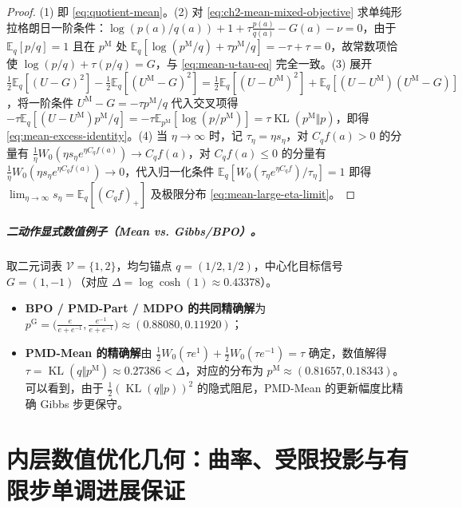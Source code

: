 \documentclass[lang=cn,scheme=chinese,openany]{../book/elegantbook}
\newcommand{\E}{\mathbb E}
\newcommand{\KL}{\operatorname{KL}}
\begin{document}
\begin{proof}
(1) 即 \cref{eq:quotient-mean}。(2) 对 \cref{eq:ch2-mean-mixed-objective} 求单纯形拉格朗日一阶条件：$\log(p(a)/q(a))+1+\tau\frac{p(a)}{q(a)}-G(a)-\nu=0$，由于 $\E_q[p/q]=1$ 且在 $p^{\mathrm M}$ 处 $\E_q[\log(p^{\mathrm M}/q)+\tau p^{\mathrm M}/q]=-\tau+\tau=0$，故常数项恰使 $\log(p/q)+\tau(p/q)=G$，与 \cref{eq:mean-u-tau-eq} 完全一致。(3) 展开 $\frac12\E_q[(U-G)^2]-\frac12\E_q[(U^{\mathrm M}-G)^2]=\frac12\E_q[(U-U^{\mathrm M})^2]+\E_q[(U-U^{\mathrm M})(U^{\mathrm M}-G)]$，将一阶条件 $U^{\mathrm M}-G=-\tau p^{\mathrm M}/q$ 代入交叉项得 $-\tau\E_q[(U-U^{\mathrm M})p^{\mathrm M}/q]=-\tau\E_{p^{\mathrm M}}[\log(p/p^{\mathrm M})]=\tau\KL(p^{\mathrm M}\Vert p)$，即得 \cref{eq:mean-excess-identity}。(4) 当 $\eta\to\infty$ 时，记 $\tau_\eta=\eta s_\eta$，对 $C_q f(a)>0$ 的分量有 $\frac{1}{\eta}W_0(\eta s_\eta e^{\eta C_q f(a)})\to C_q f(a)$，对 $C_q f(a)\le 0$ 的分量有 $\frac{1}{\eta}W_0(\eta s_\eta e^{\eta C_q f(a)})\to 0$，代入归一化条件 $\E_q[W_0(\tau_\eta e^{\eta C_q f})/\tau_\eta]=1$ 即得 $\lim_{\eta\to\infty} s_\eta=\E_q[(C_q f)_+]$ 及极限分布 \cref{eq:mean-large-eta-limit}。
\end{proof}

\paragraph{二动作显式数值例子（Mean vs. Gibbs/BPO）。}
取二元词表 $\mathcal V=\{1,2\}$，均匀锚点 $q=(1/2,1/2)$，中心化目标信号 $G=(1,-1)$（对应 $\Delta=\log\cosh(1)\approx 0.43378$）。
\begin{itemize}
 \item \textbf{BPO / PMD-Part / MDPO 的共同精确解}为 $p^{\mathrm G}=\bigl(\frac{e}{e+e^{-1}},\frac{e^{-1}}{e+e^{-1}}\bigr)\approx (0.88080, 0.11920)$；
 \item \textbf{PMD-Mean 的精确解}由 $\frac12 W_0(\tau e^1)+\frac12 W_0(\tau e^{-1})=\tau$ 确定，数值解得 $\tau=\KL(q\Vert p^{\mathrm M})\approx 0.27386<\Delta$，对应的分布为 $p^{\mathrm M}\approx (0.81657, 0.18343)$。可以看到，由于 $\frac12(\KL(q\Vert p))^2$ 的隐式阻尼，PMD-Mean 的更新幅度比精确 Gibbs 步更保守。
\end{itemize}

\chapter{内层数值优化几何：曲率、受限投影与有限步单调进展保证}
\label{ch:inner-geometry}
\end{document}
